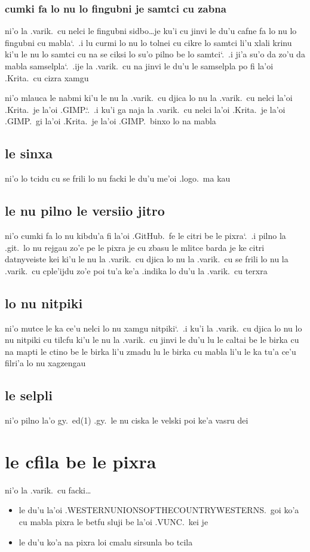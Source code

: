 \documentclass{report}
\newcommand\sds{\spacefactor\sfcode`.\ \space}
\begin{document}
\subsubsection{cumki fa lo nu lo fingubni je samtci cu zabna}
ni'o la .varik.\ cu nelci le fingubni sidbo\ldots je ku'i cu jinvi le du'u cafne fa lo nu lo fingubni cu mabla\sds  .i lu curmi lo nu lo tolnei cu cikre lo samtci li'u xlali krinu ki'u le nu lo samtci cu na se ciksi lo su'o pilno be lo samtci\sds  .i ji'a su'o da zo'u da mabla samselpla\sds  .ije la .varik.\ cu na jinvi le du'u le samselpla po fi la'oi .Krita.\ cu cizra xamgu

ni'o mlauca le nabmi ki'u le nu la .varik.\ cu djica lo nu la .varik.\ cu nelci la'oi .Krita.\ je la'oi .GIMP.\sds  .i ku'i ga naja la .varik.\ cu nelci la'oi .Krita.\ je la'oi .GIMP.\ gi la'oi .Krita.\ je la'oi .GIMP.\ binxo lo na mabla

\subsection{le sinxa}
ni'o lo tcidu cu se frili lo nu facki le du'u me'oi .logo.\ ma kau

\subsection{le nu pilno le versiio jitro}
ni'o cumki fa lo nu kibdu'a fi la'oi .GitHub.\ fe le citri be le pixra\sds  .i pilno la .git.\ lo nu rejgau zo'e pe le pixra je cu zbasu le mlitce barda je ke citri datnyveiste kei ki'u le nu la .varik.\ cu djica lo nu la .varik.\ cu se frili lo nu la .varik.\ cu cple'ijdu zo'e poi tu'a ke'a .indika lo du'u la .varik.\ cu terxra

\subsection{lo nu nitpiki}
ni'o mutce le ka ce'u nelci lo nu xamgu nitpiki\sds  .i ku'i la .varik.\ cu djica lo nu lo nu nitpiki cu tilcfu ki'u le nu la .varik.\ cu jinvi le du'u lu le caltai be le birka cu na mapti le ctino be le birka li'u zmadu lu le birka cu mabla li'u le ka tu'a ce'u filri'a lo nu xagzengau

\subsection{le selpli}
ni'o pilno la'o gy.\ ed(1) .gy.\ le nu ciska le velski poi ke'a vasru dei

\section{le cfila be le pixra}
ni'o la .varik.\ cu facki\ldots
\begin{itemize}
	\item le du'u la'oi .WESTERNUNIONSOFTHECOUNTRYWESTERNS.\ goi ko'a cu mabla pixra le betfu sluji be la'oi .VUNC.\ kei je
	\item le du'u ko'a na pixra loi cmalu sirsunla bo tcila
\end{itemize}
\end{document}
